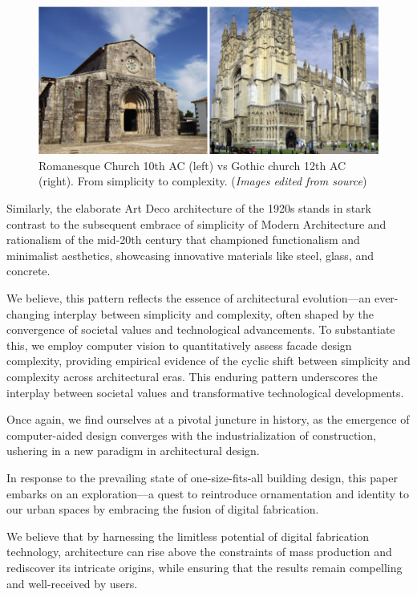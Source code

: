      \begin{figure}[htb]
          \centering
          \includegraphics[width= \linewidth]{Images/RomanesqueVsGothic}
          \caption{Romanesque Church 10th AC (left) vs Gothic church 12th AC (right). From simplicity to complexity. (\textit{Images edited from source})}
          \label{fig:RomanesquevsGothic}
        \end{figure}

Similarly, the elaborate Art Deco architecture of the 1920s stands in stark contrast to the subsequent embrace of simplicity of Modern Architecture and rationalism  of the mid-20th century that championed functionalism and minimalist aesthetics, showcasing innovative materials like steel, glass, and concrete\cite{Stacbond2020}.

We believe, this pattern reflects the essence of architectural evolution—an ever-changing interplay between simplicity and complexity, often shaped by the convergence of societal values and technological advancements.
To substantiate this, we employ computer vision to quantitatively assess facade design complexity, providing empirical evidence of the cyclic shift between simplicity and complexity across architectural eras.
This enduring pattern underscores the interplay between societal values and transformative technological developments.

Once again, we find ourselves at a pivotal juncture in history, as the emergence of computer-aided design converges with the industrialization of construction, ushering in a new paradigm in architectural design.

In response to the prevailing state of one-size-fits-all building design, this paper embarks on an exploration—a quest to reintroduce ornamentation and identity to our urban spaces by embracing the fusion of digital fabrication.

We believe that by harnessing the limitless potential of digital fabrication technology, architecture can rise above the constraints of mass production and rediscover its intricate origins, while ensuring that the results remain compelling and well-received by users.

